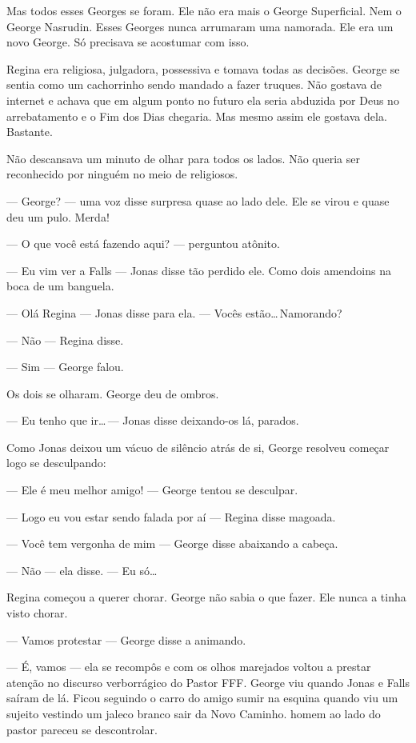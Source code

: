 Mas todos esses Georges se foram. Ele não era mais o George Superficial. Nem o George Nasrudin. Esses Georges nunca arrumaram uma namorada. Ele era um novo George. Só precisava se acostumar com isso.

Regina era religiosa, julgadora, possessiva e tomava todas as decisões. George se sentia como um cachorrinho sendo mandado a fazer truques. Não gostava de internet e achava que em algum ponto no futuro ela seria abduzida por Deus no arrebatamento e o Fim dos Dias chegaria. Mas mesmo assim ele gostava dela. Bastante.

 Não descansava um minuto de olhar para todos os lados. Não queria ser reconhecido por ninguém no meio de religiosos.

--- George? --- uma voz disse surpresa quase ao lado dele. Ele se virou e quase deu um pulo. Merda!

--- O que você está fazendo aqui? --- perguntou\mudanca{,} atônito.

--- Eu vim ver a Falls --- Jonas disse\mudanca{,} tão perdido  ele. Como dois amendoins na boca de um banguela.

--- Olá Regina --- Jonas disse para ela. --- Vocês estão\ldots\,Namorando?

--- Não --- Regina disse.

--- Sim --- George falou.

Os dois se olharam. George deu de ombros.

--- Eu tenho que ir\ldots\,--- Jonas disse\mudanca{,} deixando-os lá, parados.

Como Jonas deixou um vácuo de silêncio atrás de si, George resolveu começar logo se desculpando:

--- Ele é meu melhor amigo! --- George tentou se desculpar.

--- Logo eu vou estar sendo falada por aí --- Regina disse\mudanca{,} magoada.

--- Você tem vergonha de mim --- George disse abaixando a cabeça.

--- Não --- ela disse. --- Eu só\ldots

Regina começou a querer chorar. George não sabia o que fazer. Ele nunca a tinha visto chorar.

--- Vamos protestar --- George disse a animando.

--- É, vamos --- ela se recompôs\mudanca{,} e\mudanca{,} com os olhos marejados\mudanca{,} voltou a prestar atenção no discurso verborrágico do Pastor FFF. George viu quando Jonas e Falls saíram de lá. Ficou seguindo  o carro do amigo sumir na esquina\mudanca{,} quando viu um sujeito vestindo um jaleco branco sair da Novo Caminho.  homem ao lado do pastor pareceu se descontrolar.

